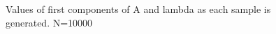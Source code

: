 \documentclass{article}
\begin{document}
\begin{figure}[H]
	\centerline{
		}
	\caption{Values of first components of A and lambda as each sample is generated. N=10000}
	\label{1.fig:r5_seq}
\end{figure}
\end{document}
